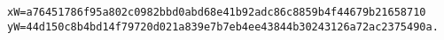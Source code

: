 \begin{verbatim}
xW=a76451786f95a802c0982bbd0abd68e41b92adc86c8859b4f44679b21658710
yW=44d150c8b4bd14f79720d021a839e7b7eb4ee43844b30243126a72ac2375490a.
\end{verbatim}
